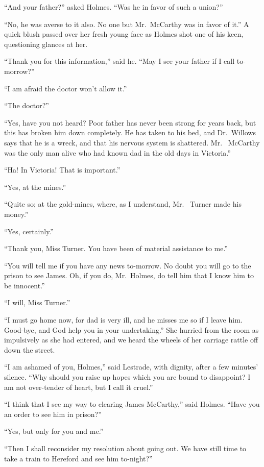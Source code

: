 “And your father?” asked Holmes. “Was he in favor of
such a union?”

“No, he was averse to it also. No one but Mr.~McCarthy
was in favor of it.” A quick blush passed over her fresh
young face as Holmes shot one of his keen, questioning
glances at her.

“Thank you for this information,” said he. “May I see
your father if I call to-morrow?”

“I am afraid the doctor won’t allow it.”

“The doctor?”

“Yes, have you not heard? Poor father has never been
strong for years back, but this has broken him down completely.
He has taken to his bed, and Dr.\ Willows says that
he is a wreck, and that his nervous system is shattered. Mr.\ %
McCarthy was the only man alive who had known dad in the
old days in Victoria.”

“Ha! In Victoria! That is important.”

“Yes, at the mines.”

“Quite so; at the gold-mines, where, as I understand, Mr.\ %
Turner made his money.”

“Yes, certainly.”

“Thank you, Miss Turner. You have been of material
assistance to me.”

“You will tell me if you have any news to-morrow. No
doubt you will go to the prison to see James. Oh, if you do,
Mr.~Holmes, do tell him that I know him to be innocent.”

“I will, Miss Turner.”

“I must go home now, for dad is very ill, and he misses
me so if I leave him. Good-bye, and God help you in your
undertaking.” She hurried from the room as impulsively as
she had entered, and we heard the wheels of her carriage rattle
off down the street.

“I am ashamed of you, Holmes,” said Lestrade, with dignity,
after a few minutes’ silence. “Why should you raise up
hopes which you are bound to disappoint? I am not over-tender
of heart, but I call it cruel.”

“I think that I see my way to clearing James McCarthy,”
said Holmes. “Have you an order to see him in prison?”

“Yes, but only for you and me.”

“Then I shall reconsider my resolution about going out.
We have still time to take a train to Hereford and see him
to-night?”

